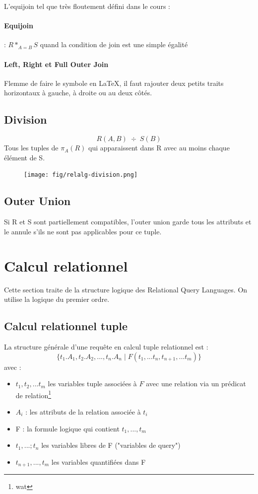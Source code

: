 \documentclass[a4paper]{article}
\begin{document}
  L'equijoin tel que très floutement défini dans le cours :

  \paragraph{Equijoin} : $R *_{A=B} S$ quand la condition de join est une simple égalité

  \paragraph{Left, Right et Full Outer Join} Flemme de faire le symbole en \LaTeX,
  il faut rajouter deux petits traits horizontaux à gauche, à droite ou au deux
  côtés.

  \subsection{Division}
  $$ R(A,B)\; \div\; S(B) $$
  Tous les tuples de $\pi_{A}(R)$ qui apparaissent dans R avec au moins chaque
  élément de S.

  \begin{figure}[H]
    \center
    \texttt{[image: fig/relalg-division.png]}
  \end{figure}

  \subsection{Outer Union}
  Si R et S sont partiellement compatibles, l'outer union garde tous les attributs
  et le annule s'ils ne sont pas applicables pour ce tuple.


\section{Calcul relationnel}
  Cette section traite de la structure logique des Relational Query Languages.
  On utilise la logique du premier ordre.\\

  \subsection{Calcul relationnel tuple}
  La structure générale d'une requête en calcul tuple relationnel est :
  $$ \{t_1.A_1, t_2.A_2,...,t_n.A_n\; | \; F(t_1, ... t_n,t_{n+1},...t_{m})\} $$
  avec :
  \begin{itemize}
    \item $t_1, t_2,...t_m$ les variables tuple associées à $F$ avec une relation
    via un prédicat de relation\footnote{wat}
    \item $A_i$ : les attributs de la relation associée à $t_i$
    \item F : la formule logique qui contient $t_1,...,t_m$
    \item $t_1,...;t_n$ les variables libres de F ("variables de query")
    \item $t_{n+1},...,t_m$ les variables quantifiées dans F
  \end{itemize}
\end{document}
